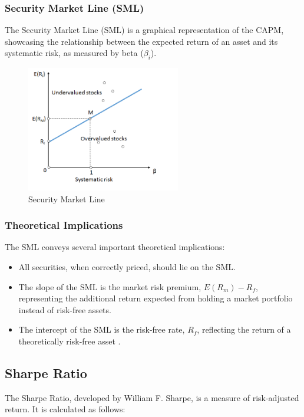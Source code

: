 \subsubsection{Security Market Line (SML)}
The Security Market Line (SML) is a graphical representation of the CAPM, showcasing the relationship between the expected return of an asset and its systematic risk, as measured by beta ($\beta_i$).

\begin{figure}[!ht]
    \centering
    \includegraphics[width=0.6\textwidth]{../Figures/SML.png}
    \caption{Security Market Line}
    \label{fig:SML}
\end{figure}

\subsubsection{Theoretical Implications}
The SML conveys several important theoretical implications:
\begin{itemize}
    \item All securities, when correctly priced, should lie on the SML.
    \item The slope of the SML is the market risk premium, $E(R_m) - R_f$, representing the additional return expected from holding a market portfolio instead of risk-free assets.
    \item The intercept of the SML is the risk-free rate, $R_f$, reflecting the return of a theoretically risk-free asset \citep{sharpe1964capital}.
\end{itemize}

\subsection{Sharpe Ratio}
The Sharpe Ratio, developed by William F. Sharpe, is a measure of risk-adjusted return. It is calculated as follows:

